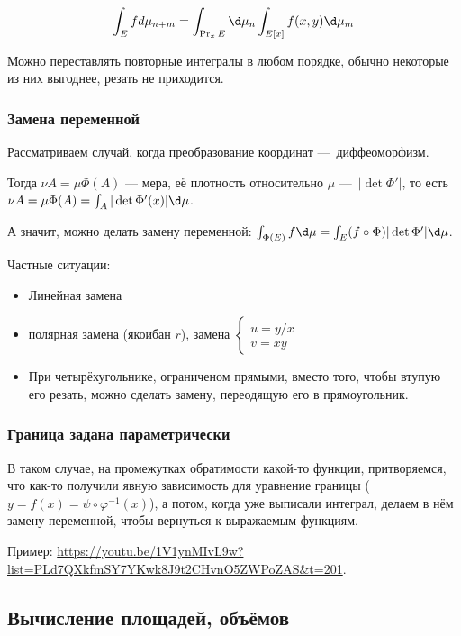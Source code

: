 \documentclass[12pt, a4paper]{article}
\begin{document}
\begin{equation}
  \int_{E} f d \mu_{n + m} = \int_{\Pr_x E} \d \mu_{n} \int_{E[x]} f(x, y) \d \mu_{m}
\end{equation}

Можно переставлять повторные интегралы в любом порядке,
обычно некоторые из них выгоднее, резать не приходится.


\subsubsection{Замена переменной}

Рассматриваем случай, когда преобразование координат — диффеоморфизм.

Тогда $\nu A = \mu \Phi (A)$ — мера, её плотность относительно $\mu$ — $|\det \Phi'|$, то есть $\nu A = \mu \Phi (A) = \int_A |\det \Phi'(x)| \d \mu$.

А значит, можно делать замену переменной: $\int_{\Phi(E)} f \d \mu = \int_E (f \circ \Phi) |\det \Phi'| \d \mu$.

Частные ситуации:
\begin{itemize}
  \item Линейная замена
  \item полярная замена (якоибан $r$), замена $\begin{cases}
    u = y/x \\
    v = xy
  \end{cases}$
  \item При четырёхугольнике, ограниченом прямыми,
  вместо того, чтобы втупую его резать, можно сделать замену,
  переодящую его в прямоугольник.
\end{itemize}

\subsubsection{Граница задана параметрически}

В таком случае, на промежутках обратимости какой-то функции, притворяемся,
что как-то получили явную зависимость для уравнение границы ($y = f(x) = \psi \circ \varphi^{-1}(x)$),
а потом, когда уже выписали интеграл, делаем в нём замену переменной, чтобы вернуться к выражаемым функциям.

Пример: \url{https://youtu.be/1V1ynMIvL9w?list=PLd7QXkfmSY7YKwk8J9t2CHvnO5ZWPoZAS&t=201}.



\subsection{Вычисление площадей, объёмов}
\end{document}
